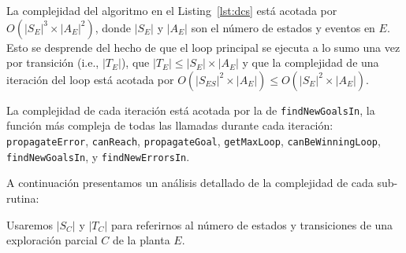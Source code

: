 La complejidad del algoritmo en el Listing~\ref{lst:dcs} está acotada por
	$O(|S_E|^3 
	\times |A_E|^2)$, donde $|S_E|$ y $|A_E|$ son el número de estados y eventos en
	$E$. Esto se desprende del hecho de que el loop principal se ejecuta a lo sumo una vez por transición (i.e., 
	$|T_{E}|$), que $|T_{E}| \leq|S_{E}|\times|A_E|$ y que la complejidad de una iteración del loop está acotada por $O(|S_{ES}|^2 \times |A_{E}|) \leq O(|S_{E}|^2 \times 
	|A_{E}|) $.

La complejidad de cada iteración está acotada por la de \texttt{findNewGoalsIn}, la función más compleja de todas las llamadas durante cada iteración: \texttt{propagateError}, \texttt{canReach},
\texttt{propagateGoal}, 
	 \texttt{getMaxLoop}, \texttt{canBeWinningLoop}, 
	\texttt{findNewGoalsIn}, y \texttt{findNewErrorsIn}.
	
A continuación presentamos un análisis detallado de la complejidad de cada sub-rutina: 

Usaremos $|S_C|$ y $|T_C|$ para referirnos al número de estados y transiciones de una exploración parcial $C$ de la planta $E$.


